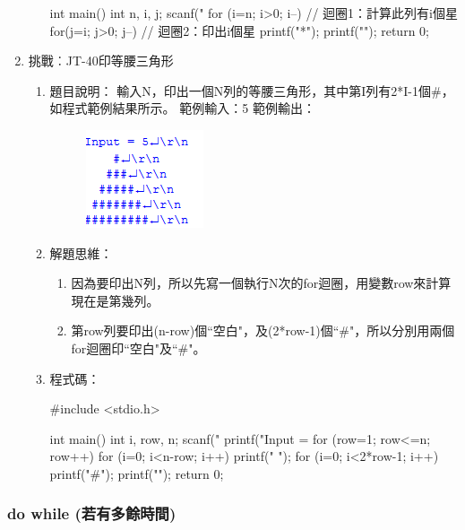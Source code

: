 \begin{enumerate}
\begin{enumerate}
\begin{cppcode}
			int main()
			{
				int n, i, j;
				scanf("%
				for (i=n; i>0; i--) { // 迴圈1：計算此列有i個星
					for(j=i; j>0; j--) { // 迴圈2：印出i個星
						printf("*");
					}
					printf("\n");
				}
				return 0;
			}
				
			\end{cppcode}
		\end{enumerate}
	
	\item 挑戰︰JT-40印等腰三角形
		\begin{enumerate}
			\item 題目說明：
			\subitem 輸入N，印出一個N列的等腰三角形，其中第I列有2*I-1個\#，如程式範例結果所示。
			\subitem 範例輸入：5
			\subitem 範例輸出：
			\begin{figure}[H]
				\centering
				\includegraphics{fig/JT40fig}
			\end{figure}
			
			\item 解題思維：
			\begin{enumerate}
				\item 因為要印出N列，所以先寫一個執行N次的for迴圈，用變數row來計算現在是第幾列。
				\item 第row列要印出(n-row)個``空白"，及(2*row-1)個``\#"，所以分別用兩個for迴圈印``空白"及``\#"。
			\end{enumerate}
			
			\item 程式碼：
			\begin{cppcode}
				#include <stdio.h>
				
				int main()
				{
					int i, row, n;
					scanf("%
					printf("Input = %
					for (row=1; row<=n; row++) {
						for (i=0; i<n-row; i++) printf(" ");
						for (i=0; i<2*row-1; i++) printf("#");
						printf("\n");
					}
					return 0;
				}
				
			\end{cppcode}
		\end{enumerate}

\end{enumerate}

\subsubsection {do while {\color{blue}(若有多餘時間)}}

